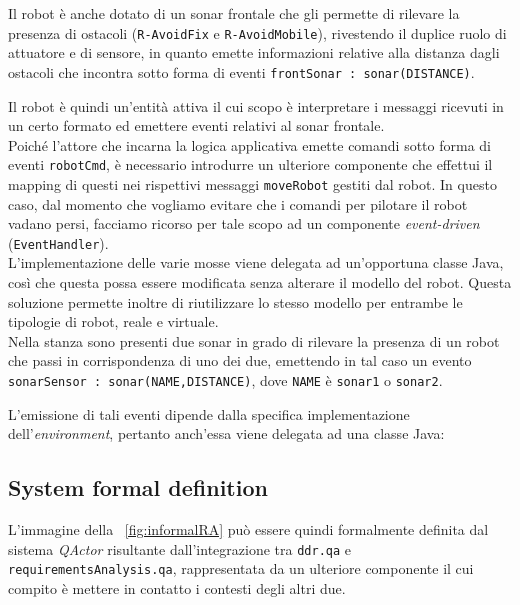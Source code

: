 \documentclass{../llncs}
\newcommand{\codescript}[1]{{\mbox{\small{\texttt{#1}}}}\xspace}
\newcommand{\code}[1]{{\color{blue}\small{\texttt{#1}}}}
\newcommand{\qa}{\textsf{\textit{QActor}}\xspace}
\newcommand{\xf}[1]{\figurename~\ref{fig:#1}}
\begin{document}
Il robot è anche dotato di un sonar frontale che gli permette di rilevare la presenza di ostacoli (\code{R-AvoidFix} e \code{R-AvoidMobile}), rivestendo il duplice ruolo di attuatore e di sensore, in quanto emette informazioni relative alla distanza dagli ostacoli che incontra sotto forma di eventi \codescript{frontSonar : sonar(DISTANCE)}.

Il robot è quindi un'entità attiva il cui scopo è interpretare i messaggi ricevuti in un certo formato ed emettere eventi relativi al sonar frontale.\\

Poiché l'attore che incarna la logica applicativa emette comandi sotto forma di eventi \codescript{robotCmd}, è necessario introdurre un ulteriore componente che effettui il mapping di questi nei rispettivi messaggi \codescript{moveRobot} gestiti dal robot. In questo caso, dal momento che vogliamo evitare che i comandi per pilotare il robot vadano persi, facciamo ricorso per tale scopo ad un componente \emph{event-driven} (\texttt{EventHandler}).\\



L'implementazione delle varie mosse viene delegata ad un'opportuna classe Java, così che questa possa essere modificata senza alterare il modello del robot. Questa soluzione permette inoltre di riutilizzare lo stesso modello per entrambe le tipologie di robot, reale e virtuale.\\

Nella stanza sono presenti due sonar in grado di rilevare la presenza di un robot che passi in corrispondenza di uno dei due, emettendo in tal caso un evento \codescript{sonarSensor : sonar(NAME,DISTANCE)}, dove \codescript{NAME} è \code{sonar1} o \code{sonar2}.

L'emissione di tali eventi dipende dalla specifica implementazione dell'\textit{environment}, pertanto anch'essa viene delegata ad una classe Java:\\



\subsection{System formal definition}
L'immagine della \xf{informalRA} può essere quindi formalmente definita dal sistema {\qa} risultante dall'integrazione tra \codescript{ddr.qa} e \codescript{requirementsAnalysis.qa}, rappresentata da un ulteriore componente il cui compito è mettere in contatto i contesti degli altri due.\\
\end{document}
